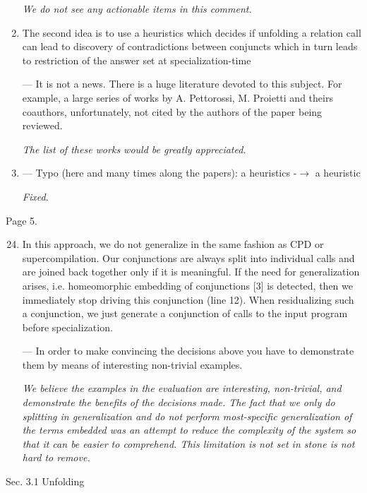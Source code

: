 \begin{enumerate}
{    \emph{We do not see any actionable items in this comment.}
  }

  \item{
    The second idea is to use a heuristics which decides if unfolding a relation call can lead to discovery of contradictions between conjuncts which in turn leads to restriction of the answer set at specialization-time

    --- It is not a news. There is a huge literature devoted to this subject. For example, a large series of works by A. Pettorossi, M. Proietti and theirs coauthors, unfortunately, not cited by the authors of the paper being reviewed.

    \emph{The list of these works would be greatly appreciated.}
  }

  \item{ --- Typo (here and many times along the papers): a heuristics -$\to$ a heuristic

  \emph{Fixed.}
  }

\end{enumerate}

Page 5.

\begin{enumerate}
  \setcounter{enumi}{23}
  \item {
    In this approach, we do not generalize in the same fashion as CPD or supercompilation. Our conjunctions are always split into individual calls and are joined back together only if it is meaningful. If the need for generalization arises, i.e. homeomorphic embedding of conjunctions [3] is detected, then we immediately stop driving this conjunction (line 12). When residualizing such a conjunction, we just generate a conjunction of calls to the input program before specialization.

    --- In order to make convincing the decisions above you have to demonstrate them by means of interesting non-trivial examples.

    \emph{We believe the examples in the evaluation are  interesting, non-trivial, and demonstrate the benefits of the decisions made. The fact that we only do splitting in generalization and do not perform most-specific generalization of the terms embedded was an attempt to reduce the complexity of the system so that it can be easier to comprehend. This limitation is not set in stone is not hard to remove. }

  }
\end{enumerate}

Sec. 3.1 Unfolding

